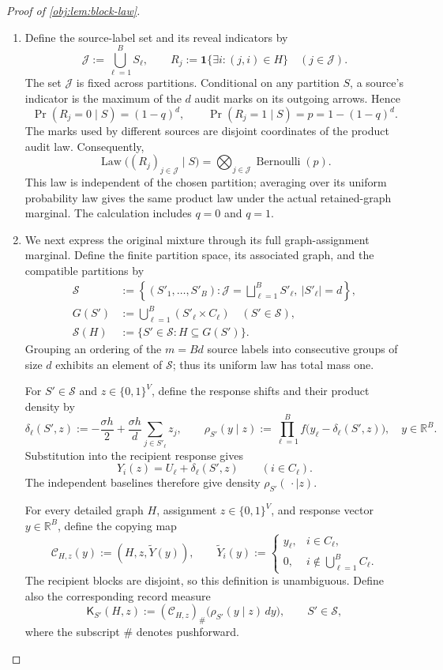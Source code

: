 \begin{proof}[Proof of \cref{obj:lem:block-law}]
\begin{enumerate}
\item Define the source-label set and its reveal indicators by
\[
\mathcal J:=\bigcup_{\ell=1}^{B}S_\ell,
\qquad
R_j:=\mathbf1\{\exists i:(j,i)\in H\}
\quad(j\in\mathcal J).
\]
The set \(\mathcal J\) is fixed across partitions. Conditional on any partition \(S\), a source's indicator is the maximum of the \(d\) audit marks on its outgoing arrows. Hence
\[
\Pr(R_j=0\mid S)=(1-q)^d,
\qquad
\Pr(R_j=1\mid S)=p=1-(1-q)^d.
\]
The marks used by different sources are disjoint coordinates of the product audit law. Consequently,
\[
\operatorname{Law}\bigl((R_j)_{j\in\mathcal J}\mid S\bigr)
=
\bigotimes_{j\in\mathcal J}\operatorname{Bernoulli}(p).
\]
This law is independent of the chosen partition; averaging over its uniform probability law gives the same product law under the actual retained-graph marginal. The calculation includes \(q=0\) and \(q=1\). %

\item We next express the original mixture through its full graph-assignment marginal. Define the finite partition space, its associated graph, and the compatible partitions by
\[
\begin{aligned}
\mathcal S
&:=\left\{(S'_1,\ldots,S'_B):
\mathcal J=\bigsqcup_{\ell=1}^{B}S'_\ell,\ 
|S'_\ell|=d\right\},\\
G(S')&:=\bigcup_{\ell=1}^{B}(S'_\ell\times C_\ell)
\quad(S'\in\mathcal S),\\
\mathcal S(H)&:=\{S'\in\mathcal S:H\subseteq G(S')\}.
\end{aligned}
\]
Grouping an ordering of the \(m=Bd\) source labels into consecutive groups of size \(d\) exhibits an element of \(\mathcal S\); thus its uniform law has total mass one.

For \(S'\in\mathcal S\) and \(z\in\{0,1\}^{V}\), define the response shifts and their product density by
\[
\delta_\ell(S',z)
:=-\frac{\sigma h}{2}
+\frac{\sigma h}{d}\sum_{j\in S'_\ell}z_j,
\qquad
\rho_{S'}(y\mid z)
:=\prod_{\ell=1}^{B}f\bigl(y_\ell-\delta_\ell(S',z)\bigr),
\quad y\in\mathbb R^B.
\]
Substitution into the recipient response gives
\[
Y_i(z)=U_\ell+\delta_\ell(S',z)
\qquad(i\in C_\ell).
\]
The independent baselines therefore give density \(\rho_{S'}(\,\cdot\mid z)\).

For every detailed graph \(H\), assignment \(z\in\{0,1\}^{V}\), and response vector \(y\in\mathbb R^B\), define the copying map
\[
\mathcal C_{H,z}(y):=(H,z,\widetilde Y(y)),
\qquad
\widetilde Y_i(y):=
\begin{cases}
y_\ell,&i\in C_\ell,\\
0,&i\notin\bigcup_{\ell=1}^{B}C_\ell.
\end{cases}
\]
The recipient blocks are disjoint, so this definition is unambiguous. Define also the corresponding record measure
\[
\mathsf K_{S'}(H,z)
:=
(\mathcal C_{H,z})_{\#}
\bigl(\rho_{S'}(y\mid z)\,dy\bigr),
\qquad
S'\in\mathcal S,
\]
where the subscript \(\#\) denotes pushforward.


\end{enumerate}
\end{proof}

